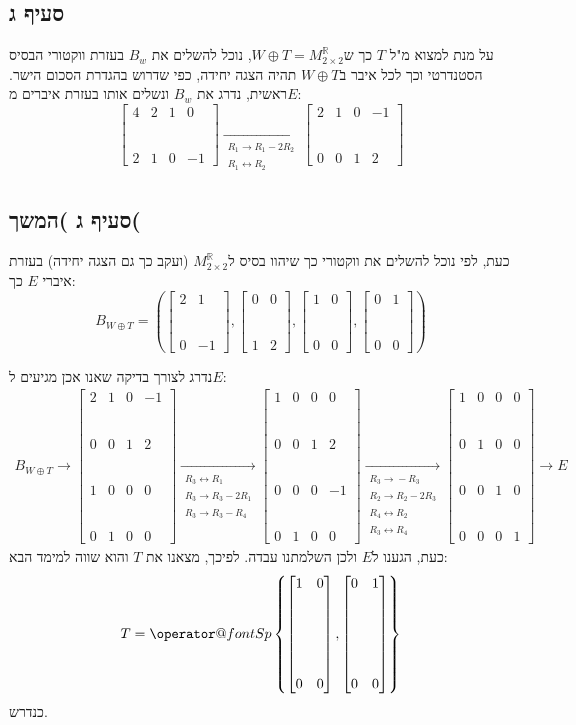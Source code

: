 \documentclass[11pt, oneside]{article}
\makeatletter
\newcommand{\qed}{\R{$\blacksquare$}}
\newcommand{\br}{\\\\\\\\\\\\}
\newcommand{\opr}[1]{\xrightarrow[\text{#1}]{}}
\newcommand{\oprm}[1]{\underset{\substack{#1}}{\longrightarrow}}
\newcommand{\bidiarrow}[1]{\underset{\text{#1}}{\leftrightarrow}}
\newcommand{\mR}{\mathbb{R}}
\newcommand{\m}[3]{\R{משפט #3#2.#1}}
\newcommand{\Sp}[1]{\mathop{\operator@font Sp}#1}
\newcommand{\tot}[4]{\begin{bmatrix}#1 & #2\br#3 & #4\end{bmatrix}}
\makeatother
\begin{document}
\subsection{סעיף ג}
על מנת למצוא מ"ל $T$ כך ש$W \oplus T = M^\mR_{2\times2}$, נוכל להשלים את $B_w$ בעזרת ווקטורי הבסיס הסטנדרטי וכך לכל איבר ב$W \oplus T$ תהיה הצגה יחידה, כפי שדרוש בהגדרת הסכום הישר. ראשית, נדרג את $B_w$ ונשלים אותו בעזרת איברים מ$E$:
\[
\begin{bmatrix}
4 & 2 & 1 & 0\br
2 & 1 & 0 & -1
\end{bmatrix}
\oprm{%
R_1 \opr{} R_1 - 2R_2\\
R_1 \bidiarrow{} R_2
}
\begin{bmatrix}
2 & 1 & 0 & -1\br
0 & 0 & 1 & 2
\end{bmatrix}
\]
\clearpage
\setcounter{subsection}{2}
\subsection{סעיף ג )המשך(}
כעת, לפי \m{8}{3}{5.} נוכל להשלים את ווקטורי כך שיהוו בסיס ל$M^\mR_{2\times2}$ (ועקב כך גם הצגה יחידה) בעזרת איברי $E$ כך:
\[
B_{W \oplus T} = \left(\tot{2}{1}{0}{-1}, \tot{0}{0}{1}{2}, \tot{1}{0}{0}{0}, \tot{0}{1}{0}{0}\right)
\]

נדרג לצורך בדיקה שאנו אכן מגיעים ל$E$:
\begin{align*}
B_{W \oplus T}
\opr{}
\begin{bmatrix}
2 & 1 & 0 & -1\br
0 & 0 & 1 & 2\br
1 & 0 & 0 & 0\br
0 & 1 & 0 & 0
\end{bmatrix}
\oprm{%
R_3 \bidiarrow{} R_1\\
R_3 \opr{} R_3 - 2R_1\\
R_3 \opr{} R_3 - R_4
}
\begin{bmatrix}
1 & 0 & 0 & 0\br
0 & 0 & 1 & 2\br
0 & 0 & 0 & -1\br
0 & 1 & 0 & 0
\end{bmatrix}
\oprm{%
R_3 \opr{} -R_3\\
R_2 \opr{} R_2 - 2R_3\\
R_4 \bidiarrow{} R_2\\
R_3 \bidiarrow{} R_4
}
\begin{bmatrix}
1 & 0 & 0 & 0\br
0 & 1 & 0 & 0\br
0 & 0 & 1 & 0\br
0 & 0 & 0 & 1
\end{bmatrix}
\opr{}
E
\end{align*}
כעת, הגענו ל$E$ ולכן השלמתנו עבדה. לפיכך, מצאנו את $T$ והוא שווה למימד הבא:
\[
T = \Sp \left\{\tot{1}{0}{0}{0}, \tot{0}{1}{0}{0}\right\}
\]
כנדרש.
\br\qed

\end{document}
